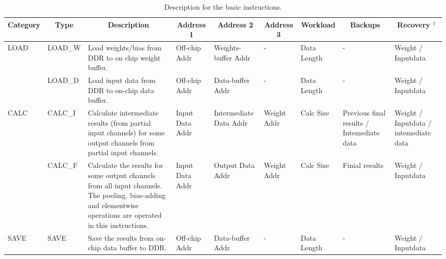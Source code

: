 \label{sec:cnninterrupt}

\begin{table}[t]
	\footnotesize
	\centering
	\caption{Description for the basic instructions.}
\begin{tabular}{|p{2.7em}|p{3.4em}|p{16em}|p{4.2em}|p{4.6em}|p{4.2em}|p{4.2em}||p{7em}|p{7em}|}
	\hline
	\multicolumn{1}{|c|}{Category} & \multicolumn{1}{c|}{Type} & \multicolumn{1}{c|}{Description} & \multicolumn{1}{c|}{Address 1} & \multicolumn{1}{c|}{Address 2} & \multicolumn{1}{c|}{Address 3} & \multicolumn{1}{c||}{Workload} & \multicolumn{1}{c|}{Backups} & \multicolumn{1}{c|}{Recovery $^1$} \bigstrut\\
	\hline
	\multirow{2}[4]{*}{LOAD} & LOAD\_W & Load weights/bias from DDR to on chip weight buffer. & Off-chip Addr & Weights-buffer Addr & -     & Data  Length & -     & Weight / Inputdata \bigstrut\\
	\cline{2-9}\multicolumn{1}{|c|}{} & LOAD\_D & Load input data from DDR to on-chip data buffer. & Off-chip Addr & Data-buffer Addr & -     & Data  Length & -     & Weight / Inputdata \bigstrut\\
	\hline
	\multirow{2}[4]{*}{CALC} & CALC\_I & Calculate intermediate results (from partial input channels) for some output channels from partial  input channels. & Input  Data Addr & Intermediate Data Addr & Weight Addr & Calc Size & Previous final results / Intemediate data  & Weight / Inputdata /  intemediate data \bigstrut\\
	\cline{2-9}\multicolumn{1}{|c|}{} & CALC\_F & Calculate the results for some output channels from all input channels. The pooling, bias-adding and elementwise operations are operated in this instructions. & Input  Data Addr & Output  Data Addr & Weight Addr & Calc Size & Finial results & Weight / Inputdata \bigstrut\\
	\hline
	SAVE  & SAVE  & Save the results from on-chip data buffer to DDR. & Off-chip Addr & Data-buffer Addr & -     & Data  Length & -     & Weight / Inputdata \bigstrut\\
	\hline
	\end{tabular}%
	
	\label{tab:instr}%
  \end{table}%


